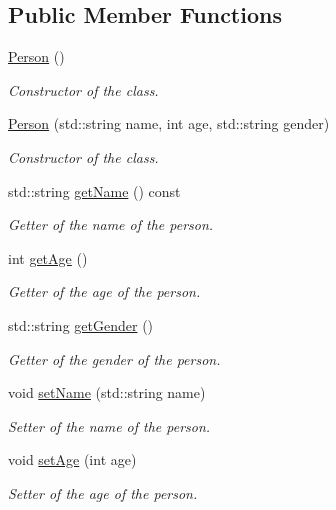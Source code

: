 \subsection*{Public Member Functions}
\begin{DoxyCompactItemize}
\item 
\mbox{\hyperlink{class_person_a0397c6f89fafc12e738923f612bc41a3}{Person}} ()
\begin{DoxyCompactList}\small\item\em Constructor of the class. \end{DoxyCompactList}\item 
\mbox{\hyperlink{class_person_a19ba5bb7e92c776268b3d453b4ef55b2}{Person}} (std\+::string name, int age, std\+::string gender)
\begin{DoxyCompactList}\small\item\em Constructor of the class. \end{DoxyCompactList}\item 
std\+::string \mbox{\hyperlink{class_person_a9db2e2ccfc6cfa0d7979613ec2aaa922}{get\+Name}} () const
\begin{DoxyCompactList}\small\item\em Getter of the name of the person. \end{DoxyCompactList}\item 
int \mbox{\hyperlink{class_person_a69b1611320c68967067747c91783d883}{get\+Age}} ()
\begin{DoxyCompactList}\small\item\em Getter of the age of the person. \end{DoxyCompactList}\item 
std\+::string \mbox{\hyperlink{class_person_a66e13299dd684b80e7f8a9303c751ad5}{get\+Gender}} ()
\begin{DoxyCompactList}\small\item\em Getter of the gender of the person. \end{DoxyCompactList}\item 
void \mbox{\hyperlink{class_person_ad6e438f456d3ae6f5b477931c0a6aeba}{set\+Name}} (std\+::string name)
\begin{DoxyCompactList}\small\item\em Setter of the name of the person. \end{DoxyCompactList}\item 
void \mbox{\hyperlink{class_person_ac8ade54c27a0657c987c395ff04a9d46}{set\+Age}} (int age)
\begin{DoxyCompactList}\small\item\em Setter of the age of the person. \end{DoxyCompactList}\item 

\end{DoxyCompactItemize}
